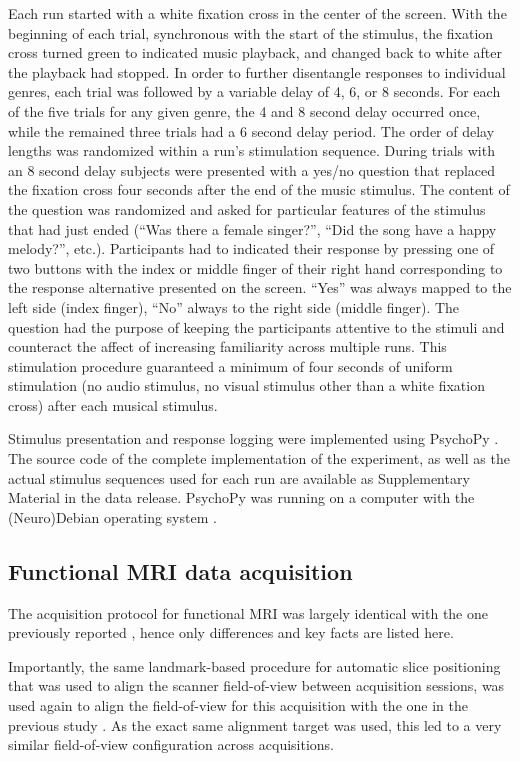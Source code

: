 Each run started with a white fixation cross in the center of the screen. With
the beginning of each trial, synchronous with the start of the stimulus, the
fixation cross turned green to indicated music playback, and changed back to
white after the playback had stopped.  In order to further disentangle
responses to individual genres, each trial was followed by a variable delay of
4, 6, or 8 seconds. For each of the five trials for any given genre, the 4 and
8 second delay occurred once, while the remained three trials had a 6 second
delay period. The order of delay lengths was randomized within a run's
stimulation sequence. During trials with an 8 second delay subjects were
presented with a yes/no question that replaced the fixation cross four seconds
after the end of the music stimulus. The content of the question was randomized
and asked for particular features of the stimulus that had just ended (``Was
there a female singer?'', ``Did the song have a happy melody?'', etc.).
Participants had to indicated their response by pressing one of two buttons
with the index or middle finger of their right hand corresponding to the
response alternative presented on the screen. ``Yes'' was always mapped to the
left side (index finger), ``No'' always to the right side (middle finger).  The
question had the purpose of keeping the participants attentive to the stimuli and
counteract the affect of increasing familiarity across multiple runs.  This
stimulation procedure guaranteed a minimum of four seconds of uniform
stimulation (no audio stimulus, no visual stimulus other than a white fixation
cross) after each musical stimulus.

Stimulus presentation and response logging were implemented using PsychoPy
\cite{Pierce_2007}.  The source code of the complete implementation of the experiment, as
well as the actual stimulus sequences used for each run are available as
Supplementary Material in the data release. PsychoPy was running on a computer
with the (Neuro)Debian operating system \cite{Halchenko_2012}.

\subsection*{Functional MRI data acquisition}

The acquisition protocol for functional MRI was largely identical with the one
previously reported \cite{Hanke_2014}, hence only differences and key facts are
listed here.

Importantly, the same landmark-based procedure for automatic slice positioning
that was used to align the scanner field-of-view between acquisition sessions,
was used again to align the field-of-view for this acquisition with the one in
the previous study \cite{Hanke_2014}. As the exact same alignment target was
used, this led to a very similar field-of-view configuration across
acquisitions.

